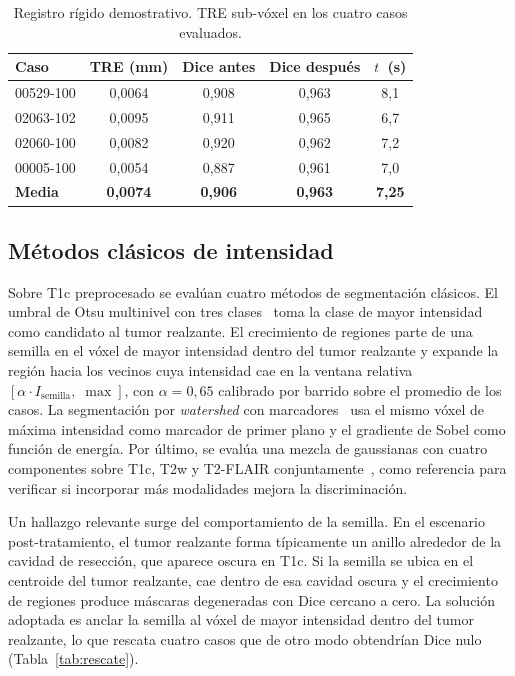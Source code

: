 \documentclass[conference]{IEEEtran}
\begin{document}
\begin{table}[h]
\centering\small
\caption{Registro r\'{i}gido demostrativo. TRE sub-v\'{o}xel en los
cuatro casos evaluados.}
\label{tab:registro}
\begin{tabular}{lcccc}
\toprule
Caso & TRE (mm) & Dice antes & Dice despu\'{e}s & $t$~(s) \\
\midrule
00529-100 & 0,0064 & 0,908 & 0,963 & 8,1 \\
02063-102 & 0,0095 & 0,911 & 0,965 & 6,7 \\
02060-100 & 0,0082 & 0,920 & 0,962 & 7,2 \\
00005-100 & 0,0054 & 0,887 & 0,961 & 7,0 \\
\midrule
\textbf{Media} & \textbf{0,0074} & \textbf{0,906} & \textbf{0,963} & \textbf{7,25} \\
\bottomrule
\end{tabular}
\end{table}

\subsection{M\'{e}todos cl\'{a}sicos de intensidad}

Sobre T1c preprocesado se eval\'{u}an cuatro m\'{e}todos de
segmentaci\'{o}n cl\'{a}sicos.
El umbral de Otsu multinivel con tres clases~\cite{otsu1979} toma la
clase de mayor intensidad como candidato al tumor realzante.
El crecimiento de regiones parte de una semilla en el v\'{o}xel de
mayor intensidad dentro del tumor realzante y expande la
regi\'{o}n hacia los vecinos cuya intensidad cae en la ventana
relativa $[\alpha \cdot I_{\text{semilla}},\;\max]$, con
$\alpha = 0{,}65$ calibrado por barrido sobre el promedio de los
casos.
La segmentaci\'{o}n por \textit{watershed} con
marcadores~\cite{vincent1991watersheds} usa el mismo v\'{o}xel de
m\'{a}xima intensidad como marcador de primer plano y el gradiente
de Sobel como funci\'{o}n de energ\'{i}a.
Por \'{u}ltimo, se eval\'{u}a una mezcla de gaussianas con cuatro
componentes sobre T1c, T2w y T2-FLAIR
conjuntamente~\cite{pedregosa2011scikit}, como referencia para
verificar si incorporar m\'{a}s modalidades mejora la discriminaci\'{o}n.

Un hallazgo relevante surge del comportamiento de la semilla.
En el escenario post-tratamiento, el tumor realzante forma
t\'{i}picamente un anillo alrededor de la cavidad de
resecci\'{o}n, que aparece oscura en T1c.
Si la semilla se ubica en el centroide del tumor realzante, cae
dentro de esa cavidad oscura y el crecimiento de regiones
produce m\'{a}scaras degeneradas con Dice cercano a cero.
La soluci\'{o}n adoptada es anclar la semilla al v\'{o}xel de mayor
intensidad dentro del tumor realzante, lo que rescata cuatro
casos que de otro modo obtendr\'{i}an Dice nulo
(Tabla~\ref{tab:rescate}).
\end{document}
